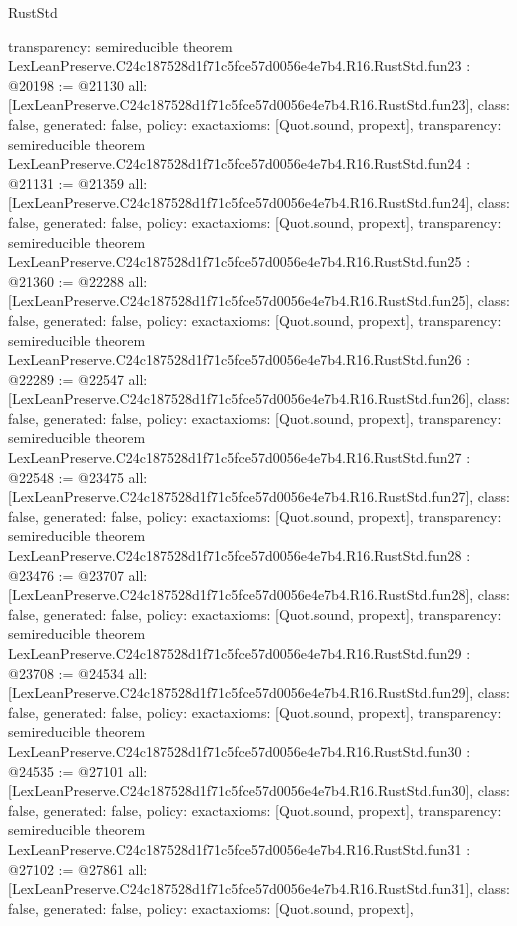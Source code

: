 \begin{lexlean}{RustStd}
\begin{coremodule}
{  transparency: semireducible
}
theorem LexLeanPreserve.C24c187528d1f71c5fce57d0056e4e7b4.R16.RustStd.fun23 : @20198 := @21130 {
  all: [LexLeanPreserve.C24c187528d1f71c5fce57d0056e4e7b4.R16.RustStd.fun23],
  class: false,
  generated: false,
  policy: exact{axioms: [Quot.sound, propext]},
  transparency: semireducible
}
theorem LexLeanPreserve.C24c187528d1f71c5fce57d0056e4e7b4.R16.RustStd.fun24 : @21131 := @21359 {
  all: [LexLeanPreserve.C24c187528d1f71c5fce57d0056e4e7b4.R16.RustStd.fun24],
  class: false,
  generated: false,
  policy: exact{axioms: [Quot.sound, propext]},
  transparency: semireducible
}
theorem LexLeanPreserve.C24c187528d1f71c5fce57d0056e4e7b4.R16.RustStd.fun25 : @21360 := @22288 {
  all: [LexLeanPreserve.C24c187528d1f71c5fce57d0056e4e7b4.R16.RustStd.fun25],
  class: false,
  generated: false,
  policy: exact{axioms: [Quot.sound, propext]},
  transparency: semireducible
}
theorem LexLeanPreserve.C24c187528d1f71c5fce57d0056e4e7b4.R16.RustStd.fun26 : @22289 := @22547 {
  all: [LexLeanPreserve.C24c187528d1f71c5fce57d0056e4e7b4.R16.RustStd.fun26],
  class: false,
  generated: false,
  policy: exact{axioms: [Quot.sound, propext]},
  transparency: semireducible
}
theorem LexLeanPreserve.C24c187528d1f71c5fce57d0056e4e7b4.R16.RustStd.fun27 : @22548 := @23475 {
  all: [LexLeanPreserve.C24c187528d1f71c5fce57d0056e4e7b4.R16.RustStd.fun27],
  class: false,
  generated: false,
  policy: exact{axioms: [Quot.sound, propext]},
  transparency: semireducible
}
theorem LexLeanPreserve.C24c187528d1f71c5fce57d0056e4e7b4.R16.RustStd.fun28 : @23476 := @23707 {
  all: [LexLeanPreserve.C24c187528d1f71c5fce57d0056e4e7b4.R16.RustStd.fun28],
  class: false,
  generated: false,
  policy: exact{axioms: [Quot.sound, propext]},
  transparency: semireducible
}
theorem LexLeanPreserve.C24c187528d1f71c5fce57d0056e4e7b4.R16.RustStd.fun29 : @23708 := @24534 {
  all: [LexLeanPreserve.C24c187528d1f71c5fce57d0056e4e7b4.R16.RustStd.fun29],
  class: false,
  generated: false,
  policy: exact{axioms: [Quot.sound, propext]},
  transparency: semireducible
}
theorem LexLeanPreserve.C24c187528d1f71c5fce57d0056e4e7b4.R16.RustStd.fun30 : @24535 := @27101 {
  all: [LexLeanPreserve.C24c187528d1f71c5fce57d0056e4e7b4.R16.RustStd.fun30],
  class: false,
  generated: false,
  policy: exact{axioms: [Quot.sound, propext]},
  transparency: semireducible
}
theorem LexLeanPreserve.C24c187528d1f71c5fce57d0056e4e7b4.R16.RustStd.fun31 : @27102 := @27861 {
  all: [LexLeanPreserve.C24c187528d1f71c5fce57d0056e4e7b4.R16.RustStd.fun31],
  class: false,
  generated: false,
  policy: exact{axioms: [Quot.sound, propext]},
}
\end{coremodule}
\end{lexlean}
